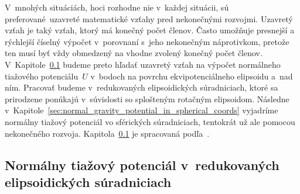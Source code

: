 \documentclass[a4paper, 12pt]{book}
\begin{document}
V~mnohých situáciách, hoci rozhodne nie v~každej situácii, sú 
preferované~uzavreté matematické vzťahy pred nekonečnými rozvojmi.  Uzavretý 
vzťah je taký vzťah, ktorý má konečný počet členov.  Často umožňuje presnejší 
a rýchlejší číselný výpočet v~porovnaní s~jeho nekonečným náprotivkom, pretože 
ten musí byť vždy obmedzený na vhodne zvolený konečný počet členov.  
V~Kapitole~\ref{sec:normal_gravity_potential_in_reduced_ell_coords} budeme 
preto hľadať uzavretý vzťah na výpočet normálneho tiažového potenciálu~$U$ 
v~bodoch na povrchu ekvipotenciálneho elipsoidu a~nad ním.  Pracovať budeme 
v~redukovaných elipsoidických súradniciach, ktoré sa prirodzene ponúkajú 
v~súvislosti so splošteným rotačným elipsoidom.  Následne 
v~Kapitole~\ref{sec:normal_gravity_potential_in_spherical_coords} vyjadríme 
normálny tiažový potenciál vo sférických súradniciach, tentokrát už ale pomocou 
nekonečného rozvoja.  
Kapitola~\ref{sec:normal_gravity_potential_in_reduced_ell_coords} je spracovaná 
podľa~\textcite{MoritzTheFigureOfTheEarth}.



\subsection{Normálny tiažový potenciál v~redukovaných elipsoidických 
súradniciach}
\label{sec:normal_gravity_potential_in_reduced_ell_coords}
\end{document}
